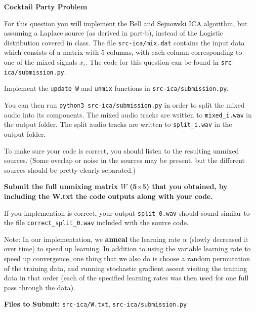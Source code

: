 \item {} \textbf{Cocktail Party Problem}

For this question you will implement the Bell and Sejnowski ICA algorithm, but
assuming a Laplace source (as derived in part-b), instead of the Logistic distribution
covered in class. The file \texttt{src-ica/mix.dat} contains the input data which consists of a matrix
with 5 columns, with each column corresponding to one of the mixed signals
$x_i$. The code for this question can be found in \texttt{src-ica/submission.py}.

Implement the \texttt{update\_W} and \texttt{unmix} functions in \texttt{src-ica/submission.py}.

You can then run \texttt{python3 src-ica/submission.py} in order to split the mixed audio into its components.
The mixed audio tracks are written to \texttt{mixed\_i.wav} in the output folder.
The split audio tracks are written to \texttt{split\_i.wav} in the output folder.

To make sure your code is correct, you should listen to the
resulting unmixed sources.  (Some overlap or noise in the sources may be present,
but the different sources should be pretty clearly separated.)

\textbf{Submit the full unmixing matrix $W$ (5$\times$5) that you obtained, by including the W.txt the code outputs along with your code.}

If you implemention is correct, your output \texttt{split\_0.wav} should sound similar to the file \texttt{correct\_split\_0.wav} included with the source code.

Note: In our implementation, we {\bf anneal} the learning rate $\alpha$
(slowly decreased it over time) to speed up learning. In addition to using the variable
learning rate to speed up convergence, one thing that we also do is
choose a random permutation of the training data, and running stochastic
gradient ascent visiting the training data in that order (each of the
specified learning rates was then used for one full pass through the data).

\textbf{Files to Submit: }\texttt{src-ica/W.txt}, \texttt{src-ica/submission.py}